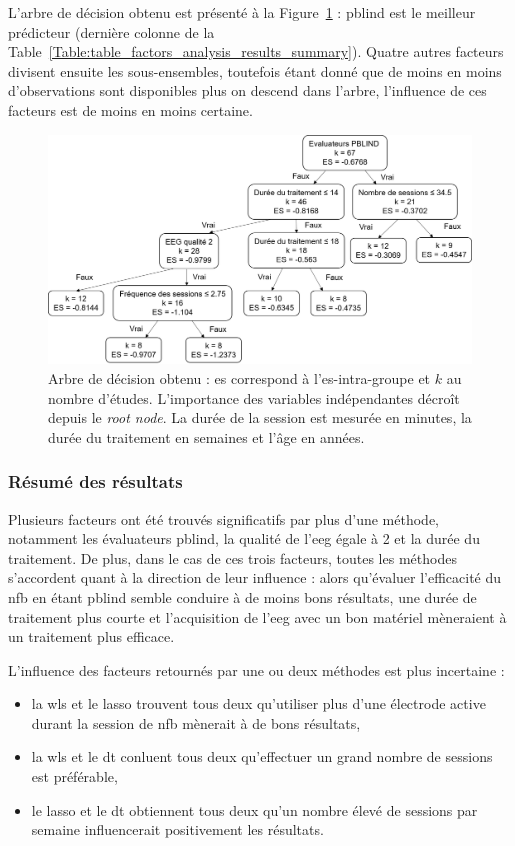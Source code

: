 L'arbre de décision obtenu est présenté à la Figure~\ref{Figure:factors_decision_tree} : \gls{pblind} est le meilleur prédicteur (dernière colonne de la
Table~\ref{Table:table_factors_analysis_results_summary}). Quatre autres facteurs divisent ensuite les sous-ensembles, toutefois étant donné que de moins
en moins d'observations sont disponibles plus on descend dans l'arbre, l'influence de ces facteurs est de moins en moins certaine.

\begin{figure}[h!]
  \centering
	\includegraphics[width=1\linewidth]{figures/chapter-3/factors-decision-tree} 
  \caption{Arbre de décision obtenu : \gls{es} correspond à l'\gls{es}-intra-groupe et $k$ au nombre d'études. L'importance des variables indépendantes
	décroît depuis le \textit{root node}. La durée de la session est mesurée en minutes, la durée du traitement en semaines et l'âge en années.}
  \label{Figure:factors_decision_tree}
\end{figure}

\subsubsection{Résumé des résultats}

Plusieurs facteurs ont été trouvés significatifs par plus d'une méthode, notamment les évaluateurs \gls{pblind}, la qualité de l'\gls{eeg} égale à 2 et la durée du traitement. 
De plus, dans le cas de ces trois facteurs, toutes les méthodes s'accordent quant à la direction de leur influence : alors qu'évaluer l'efficacité du \gls{nfb} en étant \gls{pblind}
semble conduire à de moins bons résultats, une durée de traitement plus courte et l'acquisition de l'\gls{eeg} avec un bon matériel mèneraient à un traitement plus efficace. 

L'influence des facteurs retournés par une ou deux méthodes est plus incertaine :
\begin{itemize}
	\item la \gls{wls} et le \gls{lasso} trouvent tous deux qu'utiliser plus d'une électrode active durant la session de \gls{nfb} mènerait à de bons résultats,
  \item la \gls{wls} et le \gls{dt} conluent tous deux qu'effectuer un grand nombre de sessions est préférable, 
  \item le \gls{lasso} et le \gls{dt} obtiennent tous deux qu'un nombre élevé de sessions par semaine influencerait positivement les résultats. 
\end{itemize}

